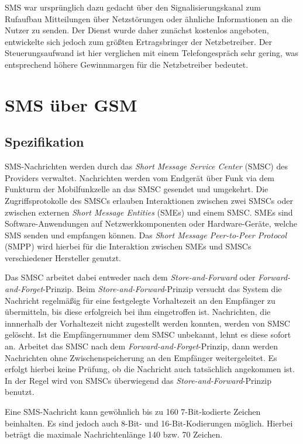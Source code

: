 \documentclass[german,12pt,a4paper]{article}
\begin{document}
SMS war ursprünglich dazu gedacht über den Signalisierungskanal zum Rufaufbau
Mitteilungen über Netzstörungen oder ähnliche Informationen an die Nutzer zu
senden. Der Dienst wurde daher zunächst kostenlos angeboten, entwickelte sich
jedoch zum größten Ertragsbringer der Netzbetreiber. Der Steuerungsaufwand ist
hier verglichen mit einem Telefongespräch sehr gering, was entsprechend höhere
Gewinnmargen für die Netzbetreiber bedeutet.

\section{SMS über GSM} %
\subsection{Spezifikation}
SMS-Nachrichten werden durch das \textit{Short Message Service Center} (SMSC) des 
Providers verwaltet. Nachrichten werden vom Endgerät über Funk via dem 
Funkturm der Mobilfunkzelle an das SMSC gesendet und umgekehrt. Die 
Zugriffsprotokolle des SMSCs erlauben Interaktionen zwischen zwei SMSCs oder 
zwischen externen \textit{Short Message Entities} (SMEs) und einem SMSC. SMEs sind 
Software-Anwendungen auf Netzwerkkomponenten oder Hardware-Geräte, welche SMS
senden und empfangen können. Das \textit{Short Message Peer-to-Peer Protocol} (SMPP) 
wird hierbei für die Interaktion zwischen SMEs und SMSCs verschiedener 
Hersteller genutzt.

Das SMSC arbeitet dabei entweder nach dem \textit{Store-and-Forward} oder 
\textit{Forward-and-Forget}-Prinzip. Beim \textit{Store-and-Forward}-Prinzip versucht das System 
die Nachricht regelmäßig für eine festgelegte Vorhaltezeit an den Empfänger 
zu übermitteln, bis diese erfolgreich bei ihm eingetroffen ist. Nachrichten, die innnerhalb 
der Vorhaltezeit nicht zugestellt werden konnten, werden von SMSC gelöscht. 
Ist die Empfängernummer dem SMSC unbekannt, lehnt es diese sofort an.
Arbeitet das SMSC nach dem \textit{Forward-and-Forget}-Prinzip, dann werden Nachrichten ohne 
Zwischenspeicherung an den Empfänger weitergeleitet. Es erfolgt hierbei keine Prüfung, 
ob die Nachricht auch tatsächlich angekommen ist. In der Regel wird von SMSCs überwiegend 
das \textit{Store-and-Forward}-Prinzip benutzt.

Eine SMS-Nachricht kann gewöhnlich bis zu 160 7-Bit-kodierte Zeichen beinhalten. 
Es sind jedoch auch 8-Bit- und 16-Bit-Kodierungen möglich. Hierbei beträgt die 
maximale Nachrichtenlänge 140 bzw. 70 Zeichen. 
\end{document}
